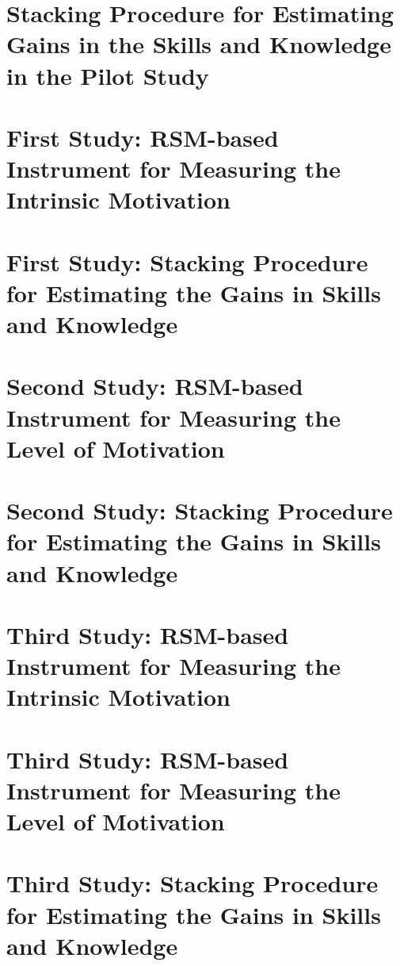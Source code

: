 
\section{Stacking Procedure for Estimating Gains in the Skills and Knowledge in the Pilot Study}
\label{sec:irt-learning-outcomes-pilot-study}

\section{First Study: RSM-based Instrument for Measuring the Intrinsic Motivation}
\label{sec:irt-motivation-first-study}

\section{First Study: Stacking Procedure for Estimating the Gains in Skills and Knowledge}
\label{sec:irt-learning-outcomes-first-study}

\section{Second Study: RSM-based Instrument for Measuring the Level of Motivation}
\label{sec:irt-motivation-second-study}

\section{Second Study: Stacking Procedure for Estimating the Gains in Skills and Knowledge}
\label{sec:irt-learning-outcomes-second-study}

\section{Third Study: RSM-based Instrument for Measuring the Intrinsic Motivation}
\label{sec:irt-intrinsic-motivation-third-study}

\section{Third Study: RSM-based Instrument for Measuring the Level of Motivation}
\label{sec:irt-level-motivation-third-study}


\section{Third Study: Stacking Procedure for Estimating the Gains in Skills and Knowledge}
\label{sec:irt-learning-outcomes-third-study}
